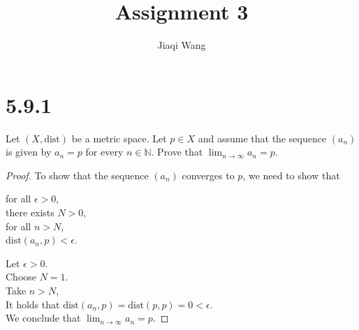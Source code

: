 \documentclass{article}
\title{Assignment 3}
\author{Jiaqi Wang}
\newcommand{\dist}{\text{dist}}
\theoremstyle{mytheoremstyle}
\theoremstyle{mytheoremstyle}
\theoremstyle{myproblemstyle}
\begin{document}
    \maketitle

    \section{5.9.1}
    \begin{problem}
        Let $(X, \text{dist})$ be a metric space. Let $p \in X$ and assume that the sequence $(a_n)$ is given by $a_n = p$ 
        for every $n \in \mathbb{N}$. Prove that $\displaystyle\lim_{n\to\infty}a_n = p$.
    \end{problem}
    \begin{proof}
        To show that the sequence $(a_n)$ converges to $p$, we need to show that 
        \begin{center}
            for all $\epsilon > 0$, \\
            there exists $N > 0$, \\
            for all $n > N$, \\
            $\dist(a_n, p) < \epsilon$.
        \end{center}

        \noindent 
        Let $\epsilon > 0$. \\
        Choose $N = 1$. \\
        Take $n > N$, \\
        It holds that $\text{dist}(a_n, p) = \text{dist}(p, p) = 0 < \epsilon$. \\
        We conclude that $\displaystyle\lim_{n\to\infty}a_n = p$.
    \end{proof}
\end{document}
